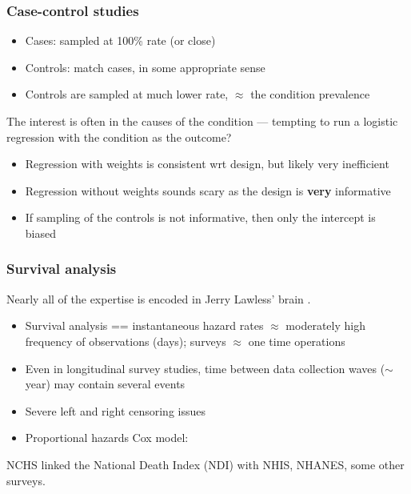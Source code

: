 \documentclass[handout]{beamer}
\begin{document}
\begin{frame}\frametitle{Case-control studies}

\begin{itemize}
    \item Cases: sampled at 100\% rate (or close)
    \item Controls: match cases, in some appropriate sense
    \item Controls are sampled at much lower rate, $\approx$ the condition prevalence
\end{itemize}

The interest is often in the causes of the condition --- tempting to run a logistic
regression with the condition as the outcome?

\begin{itemize}
    \item Regression with weights is consistent wrt design, but likely very inefficient
    \item Regression without weights sounds scary as the design is \textbf{very} informative
    \item If sampling of the controls is not informative, then only the intercept is biased
        \citep{scott:wild:2003}
\end{itemize}

\end{frame}

\begin{frame}\frametitle{Survival analysis}

Nearly all of the expertise is encoded in Jerry Lawless' brain
\citep{lawless:2003}.

\begin{itemize}
    \item Survival analysis == instantaneous hazard rates
            $\approx$ moderately high frequency
            of observations (days); surveys $\approx$ one time operations
    \item Even in longitudinal survey studies, time between data collection
          waves ($\sim$year) may contain several events
    \item Severe left and right censoring issues
    \item Proportional hazards Cox model: \citet{binder:1992}
\end{itemize}

NCHS linked the National Death Index (NDI) with NHIS, NHANES,
some other surveys.

\end{frame}
\end{document}

